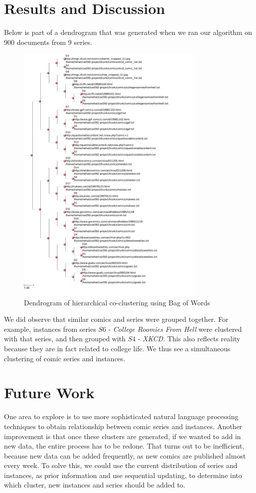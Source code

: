 \documentclass[11pt]{article}
\begin{document}
\section{Results and Discussion}
Below is part of a dendrogram that was generated when we ran our algorithm on 900 documents from 9 series.
\begin{figure}[H]
  \includegraphics[height=0.7\textheight,width=0.8\textwidth]{demo1.pdf}
  \caption{Dendrogram of hierarchical co-clustering using Bag of Words}
\end{figure}
We did observe that similar comics and series were grouped together. For example, instances from series $S6$ - \emph{College Roomies From Hell} were clustered with that series, and then grouped with $S4$ - \emph{XKCD}. This also reflects reality because they are in fact related to college life. We thus see a simultaneous clustering of comic series and instances.

\section{Future Work}
One area to explore is to use more sophisticated natural language processing techniques to obtain relationship between comic series and instances. Another improvement is that once these clusters are generated, if we wanted to add in new data, the entire process has to be redone. That turns out to be inefficient, because new data can be added frequently, as new comics are published almost every week. To solve this, we could use the current distribution of series and instances, as prior information and use sequential updating,  to determine into which cluster, new instances and series should be added to.
\end{document}

